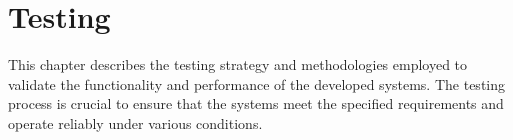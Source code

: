 \chapter{Testing}
\label{cha:testing}

This chapter describes the testing strategy and methodologies employed to
validate the functionality and performance of the developed systems. The
testing process is crucial to ensure that the systems meet the specified
requirements and operate reliably under various conditions.